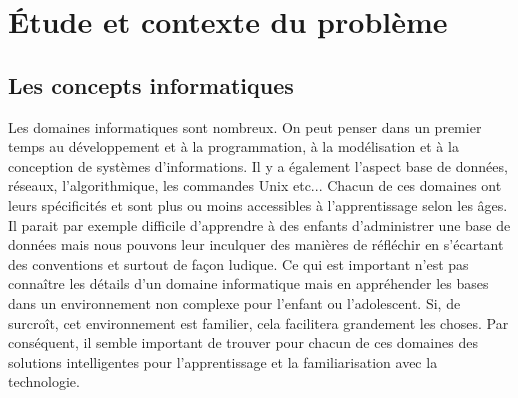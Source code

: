 \clearpage


\section{Étude et contexte du problème}
\subsection{Les concepts informatiques}
Les domaines informatiques sont nombreux. On peut penser dans un premier temps au développement et à la programmation, à la modélisation et à la conception de systèmes d'informations. Il y a également l'aspect base de données, réseaux, l'algorithmique, les commandes Unix etc... Chacun de ces domaines ont leurs spécificités et sont plus ou moins accessibles à l'apprentissage selon les âges. Il parait par exemple difficile d'apprendre à des enfants d'administrer une base de données mais nous pouvons leur inculquer des manières de réfléchir en s'écartant des conventions et surtout de façon ludique. Ce qui est important n'est pas connaître les détails d'un domaine informatique mais en appréhender les bases dans un environnement non complexe pour l'enfant ou l'adolescent. Si, de surcroît, cet environnement est familier, cela facilitera grandement les choses. Par conséquent, il semble important de trouver pour chacun de ces domaines des solutions intelligentes pour l'apprentissage et la familiarisation avec la technologie.

